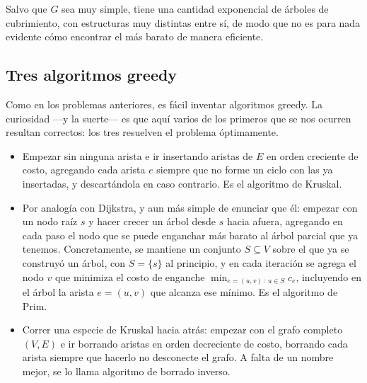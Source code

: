 \documentclass[12pt, spanish, oneside, openany]{book}
\theoremstyle{uprightplain}
\theoremstyle{definition}
\theoremstyle{remark}
\theoremstyle{definition}
\begin{document}
Salvo que $G$ sea muy simple, tiene una cantidad exponencial de árboles de cubrimiento, con estructuras muy distintas entre sí, de modo que no es para nada evidente cómo encontrar el más barato de manera eficiente.

\subsection{Tres algoritmos greedy}

Como en los problemas anteriores, es fácil inventar algoritmos greedy. La curiosidad ---y la suerte--- es que aquí varios de los primeros que se nos ocurren resultan correctos: los tres resuelven el problema óptimamente.

\begin{itemize}
    \item Empezar sin ninguna arista e ir insertando aristas de $E$ en orden creciente de costo, agregando cada arista $e$ siempre que no forme un ciclo con las ya insertadas, y descartándola en caso contrario. Es el algoritmo de Kruskal.

    \item Por analogía con Dijkstra, y aun más simple de enunciar que él: empezar con un nodo raíz $s$ y hacer crecer un árbol desde $s$ hacia afuera, agregando en cada paso el nodo que se puede enganchar más barato al árbol parcial que ya tenemos. Concretamente, se mantiene un conjunto $S \subseteq V$ sobre el que ya se construyó un árbol, con $S=\{s\}$ al principio, y en cada iteración se agrega el nodo $v$ que minimiza el costo de enganche $\min_{e=(u,v)\,:\,u\in S} c_e$, incluyendo en el árbol la arista $e=(u,v)$ que alcanza ese mínimo. Es el algoritmo de Prim.

    \item Correr una especie de Kruskal hacia atrás: empezar con el grafo completo $(V,E)$ e ir borrando aristas en orden decreciente de costo, borrando cada arista siempre que hacerlo no desconecte el grafo. A falta de un nombre mejor, se lo llama algoritmo de borrado inverso.
\end{itemize}
\end{document}
